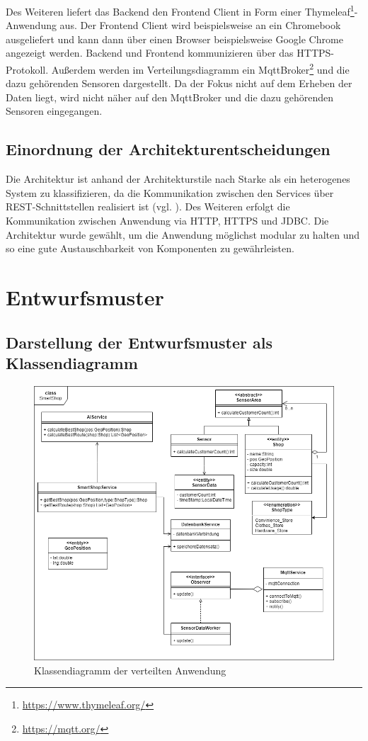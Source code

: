 \documentclass[runningheads]{llncs}
\begin{document}
Des Weiteren liefert das Backend den Frontend Client in Form einer Thymeleaf\footnote{\url{https://www.thymeleaf.org/}}-Anwendung aus.
Der Frontend Client wird beispielsweise an ein Chromebook ausgeliefert und kann dann über einen Browser beispielsweise Google Chrome angezeigt werden.
Backend und Frontend kommunizieren über das HTTPS-Protokoll.
Außerdem werden im Verteilungsdiagramm ein MqttBroker\footnote{\url{https://mqtt.org/}} und die dazu gehörenden Sensoren dargestellt.
Da der Fokus nicht auf dem Erheben der Daten liegt, wird nicht näher auf den MqttBroker und die dazu gehörenden Sensoren eingegangen.

\subsection{Einordnung der Architekturentscheidungen}
Die Architektur ist anhand der Architekturstile nach Starke als ein heterogenes System zu klassifizieren, da die Kommunikation zwischen den Services über REST-Schnittstellen realisiert ist (vgl. \cite{starke2015effektive}).
Des Weiteren erfolgt die Kommunikation zwischen Anwendung via HTTP, HTTPS und JDBC.
Die Architektur wurde gewählt, um die Anwendung möglichst modular zu halten und so eine gute Austauschbarkeit von Komponenten zu gewährleisten.

\newpage
\section{Entwurfsmuster}

\subsection{Darstellung der Entwurfsmuster als Klassendiagramm}

\begin{figure}
\includegraphics[width=\linewidth]{images/OOD-Klassendiagram}
\caption{Klassendiagramm der verteilten Anwendung}
\end{figure}
\end{document}
